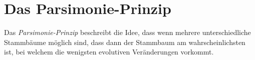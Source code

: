 \documentclass{article}
\begin{document}
\section{Das Parsimonie-Prinzip}
Das \emph{Parsimonie-Prinzip} beschreibt die Idee, dass wenn mehrere unterschiedliche Stammbäume möglich sind, dass dann der Stammbaum am wahrscheinlichsten ist, bei welchem die wenigsten evolutiven Veränderungen vorkommt.
 
\end{document}
